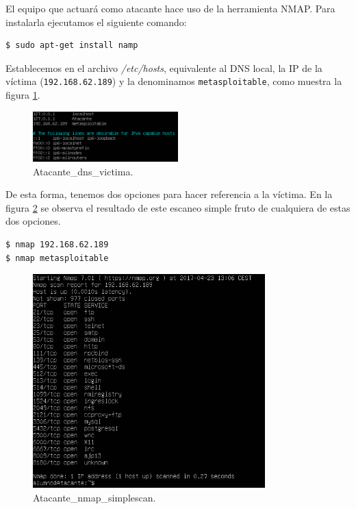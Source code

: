 \documentclass[a4,12pt,onecolum]{article}
\begin{document}
El equipo que actuará como atacante hace uso de la herramienta NMAP. Para instalarla ejecutamos el siguiente comando:

\begin{verbatim}
$ sudo apt-get install namp
\end{verbatim}

Establecemos en el archivo \emph{/etc/hosts}, equivalente al DNS local, la IP de la víctima (\texttt{192.168.62.189}) y la denominamos \texttt{metasploitable}, como muestra la figura \ref{fig:nmap1}. \\

\begin{figure}[htbp]
\centering
\includegraphics[width=0.5\textwidth]{./images/Atacante_dns_victima.png}
\caption{Atacante\_dns\_victima.}
\label{fig:nmap1}
\end{figure}

De esta forma, tenemos dos opciones para hacer referencia a la víctima. En la figura \ref{fig:nmap2} se observa el resultado de este escaneo simple fruto de cualquiera de estas dos opciones.

\begin{verbatim}
$ nmap 192.168.62.189
$ nmap metasploitable
\end{verbatim}

\begin{figure}[htbp]
\centering
\includegraphics[width=0.8\textwidth]{./images/Atacante_nmap_simplescan.png}
\caption{Atacante\_nmap\_simplescan.}
\label{fig:nmap2}
\end{figure}
\end{document}
